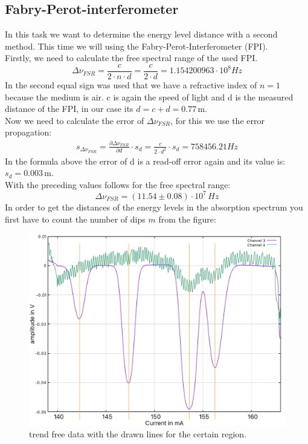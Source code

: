 \subsection{Fabry-Perot-interferometer}
In this task we want to determine the energy level distance with a second method. This time we will using the Fabry-Perot-Interferometer (FPI). \\
Firstly, we need to calculate the free spectral range of the used FPI. 
\begin{equation}
    \Delta \nu_{FSR} = \frac{c }{2 \cdot n \cdot d} = \frac{c}{2 \cdot d} = 1.154200963 \cdot 10^8 Hz
\end{equation}
In the second equal sign was used that we have a refractive index of $n=1$ because the medium is air.
c is again the speed of light and d is the measured distance of the FPI, in our case its $d = c + d = 0.77\,$m.\\
Now we need to calculate the error of $\Delta \nu_{FSR}$, for this we use the error propagation:
\begin{align}
    s_{\Delta \nu_{FSR}} = \frac{\partial \Delta \nu_{FSR}}{\partial d} \cdot s_d = \frac{c}{2\cdot d^2} \cdot s_d = 758456.21 Hz
\end{align}
In the formula above the error of d is a read-off error  again and its value is: $s_d = 0.003\,$m. \\
With the preceding values follows for the free spectral range:
\begin{equation}
    \Delta \nu_{FSR} = (11.54 \pm 0.08) \cdot 10^7\,Hz
\end{equation}
In order to get the distances of the energy levels in the absorption spectrum you first have to count the number of dips $m$ from the figure:
\begin{figure}[h]
    \centering
    \includegraphics[scale = 0.2]{Bilder/Auswertung_Anna/A2-ver.jpg}
    \caption{trend free data with the drawn lines for the certain region.}
\end{figure}


